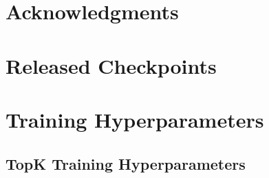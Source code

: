 \documentclass{article}
\begin{document}
\section*{Acknowledgments}





\appendix

\section{Released Checkpoints}
\label{app:checkpoints}


\section{Training Hyperparameters}
\label{app:hyperparameters}
\subsection{TopK Training Hyperparameters}
\label{app:topk_hyperparameters}
\end{document}
